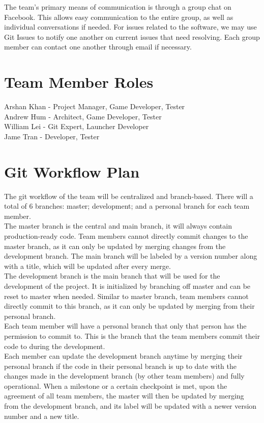 \documentclass[12pt, titlepage]{article}
\begin{document}
The team's primary means of communication is through a group chat on Facebook. This allows easy communication to the entire group, as well as individual conversations if needed. For issues related to the software, we may use Git Issues to notify one another on current issues that need resolving. Each group member can contact one another through email if necessary.

\section{Team Member Roles}

Arshan Khan - Project Manager, Game Developer, Tester \\
Andrew Hum - Architect, Game Developer, Tester \\
William Lei - Git Expert, Launcher Developer \\
Jame Tran - Developer, Tester

\section{Git Workflow Plan}

The git workflow of the team will be centralized and branch-based. There will a total of 6 branches: master; development; and a personal branch for each team member.\\
The master branch is the central and main branch, it will always contain production-ready code. Team members cannot directly commit changes to the master branch, as it can only be updated by merging changes from the development branch. The main branch will be labeled by a version number along with a title, which will be updated after every merge.\\
The development branch is the main branch that will be used for the development of the project. It is initialized by branching off master and can be reset to master when needed. Similar to master branch, team members cannot directly commit to this branch, as it can only be updated by merging from their personal branch.\\
Each team member will have a personal branch that only that person has the permission to commit to. This is the branch that the team members commit their code to during the development.\\
Each member can update the development branch anytime by merging their personal branch if the code in their personal branch is up to date with the changes made in the development branch (by other team members) and fully operational. When a milestone or a certain checkpoint is met, upon the agreement of all team members, the master will then be updated by merging from the development branch, and its label will be updated with a newer version number and a new title.
\end{document}
